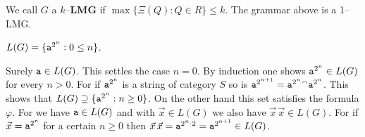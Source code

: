 We call $G$ a $k$--\textbf{LMG} if $\max \{\Xi(Q) : Q \in R\} \leq k$. 
The grammar above is a 1--LMG.
\begin{prop}
$L(G) = \{\mbox{\tt a}^{2^n} : 0 \leq n\}$.
\end{prop}
\proofbeg
Surely $\mbox{\tt a} \in L(G)$. This settles the case
$n = 0$. By induction one shows $\mbox{\tt a}^{2^n} \in L(G)$
for every $n > 0$. For if $\mbox{\tt a}^{2^n}$ is a string
of category $S$ so is $\mbox{\tt a}^{2^{n+1}} =
\mbox{\tt a}^{2^n} {^{\smallfrown}} \mbox{\tt a}^{2^n}$.
This shows that $L(G) \supseteq \{\mbox{\tt a}^{2^n} :
n \geq 0\}$. On the other hand this set satisfies the formula
$\varphi$. For we have $\mbox{\tt a} \in L(G)$ and
with $\vec{x} \in L(G)$ we also have $\vec{x}\, \vec{x} \in L(G)$.
For if $\vec{x} = \mbox{\tt a}^{2^n}$ for a certain
$n \geq 0$ then $\vec{x} \, \vec{x} = \mbox{\tt a}^{2^n \cdot 2} =
\mbox{\tt a}^{2^{n+1}} \in L(G)$.
\proofend

